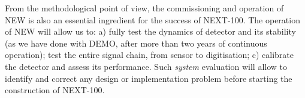 
From the methodological point of view, the commissioning and operation of NEW is also an essential ingredient for the success of NEXT-100. The operation of NEW will allow us to: a) fully test the dynamics of detector and its stability (as we have done with DEMO, after more than two years of continuous operation); test the entire signal chain, from sensor to digitisation; c) calibrate the detector and assess its performance. Such {\em system} evaluation will allow to identify and correct any design or implementation problem before starting the construction of NEXT-100. 

